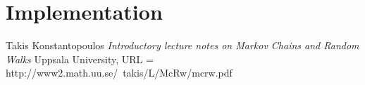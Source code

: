 \documentclass{article}
\begin{document}

\section{Implementation}

\begin{thebibliography}{1}

	 Takis Konstantopoulos {\em Introductory lecture notes on
	Markov Chains and Random Walks} Uppsala University, URL = http://www2.math.uu.se/~takis/L/McRw/mcrw.pdf
 
\end{thebibliography}
\end{document}
